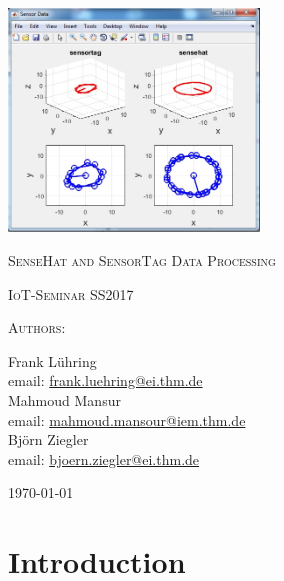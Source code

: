 \documentclass[12pt]{article}
\begin{document}
	\begin{titlepage}
		\centering
		\includegraphics[width=0.5\textwidth]{Plot.jpg}\par\vspace{1cm}
		{\scshape\huge  SenseHat and SensorTag Data Processing \par}
		\vspace{1cm}
		{\scshape\Large IoT-Seminar SS2017\par}
		{\scshape\Large Authors: \par}
		\vspace{1cm}
		{\normalsize Frank L\"uhring \\ email: \href{mailto:frank.luehring@ei.thm.de}{frank.luehring@ei.thm.de}}\\
		{\normalsize Mahmoud Mansur \\ email: \href{mailto:mahmoud.mansour@iem.thm.de}{mahmoud.mansour@iem.thm.de}}\\
		{\normalsize Bj\"orn Ziegler \\ email: \href{mailto:bjoern.ziegler@ei.thm.de}{bjoern.ziegler@ei.thm.de}}    
		\vfill
		{\large \today\par}
	\end{titlepage}

\newpage
\noindent
\lstset{basicstyle=\small,
	breaklines=true,
	language=java,
	showspaces=false,
	showtabs=false}	

\tableofcontents

\newpage
\section{Introduction}
\end{document}
